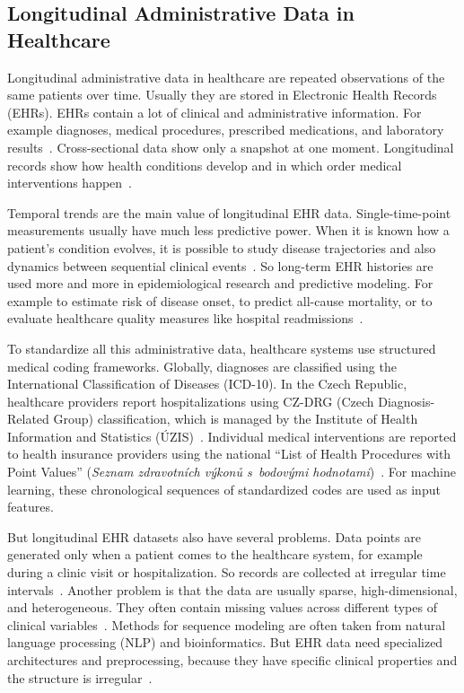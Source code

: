 \subsection{Longitudinal Administrative Data in Healthcare}
\label{sec:longitudinal_data}

Longitudinal administrative data in healthcare are repeated observations of the same patients over time. Usually they are stored in Electronic Health Records (EHRs). EHRs contain a lot of clinical and administrative information. For example diagnoses, medical procedures, prescribed medications, and laboratory results~\cite{carrasco2023prediction}. Cross-sectional data show only a snapshot at one moment. Longitudinal records show how health conditions develop and in which order medical interventions happen~\cite{moglia2025artificial}.

Temporal trends are the main value of longitudinal EHR data. Single-time-point measurements usually have much less predictive power. When it is known how a patient's condition evolves, it is possible to study disease trajectories and also dynamics between sequential clinical events~\cite{carrasco2023prediction}. So long-term EHR histories are used more and more in epidemiological research and predictive modeling. For example to estimate risk of disease onset, to predict all-cause mortality, or to evaluate healthcare quality measures like hospital readmissions~\cite{cosco2017operationalising, carrasco2023prediction}.

To standardize all this administrative data, healthcare systems use structured medical coding frameworks. Globally, diagnoses are classified using the International Classification of Diseases (ICD-10). In the Czech Republic, healthcare providers report hospitalizations using CZ-DRG (Czech Diagnosis-Related Group) classification, which is managed by the Institute of Health Information and Statistics (ÚZIS)~\cite{uzis_czdrg_2022}. Individual medical interventions are reported to health insurance providers using the national ``List of Health Procedures with Point Values'' (\textit{Seznam zdravotních výkonů s~bodovými hodnotami})~\cite{vzp_coding_2024}. For machine learning, these chronological sequences of standardized codes are used as input features.

But longitudinal EHR datasets also have several problems. Data points are generated only when a patient comes to the healthcare system, for example during a clinic visit or hospitalization. So records are collected at irregular time intervals~\cite{moglia2025artificial}. Another problem is that the data are usually sparse, high-dimensional, and heterogeneous. They often contain missing values across different types of clinical variables~\cite{cascarano2025integrating}. Methods for sequence modeling are often taken from natural language processing (NLP) and bioinformatics. But EHR data need specialized architectures and preprocessing, because they have specific clinical properties and the structure is irregular~\cite{carrasco2023prediction}.

